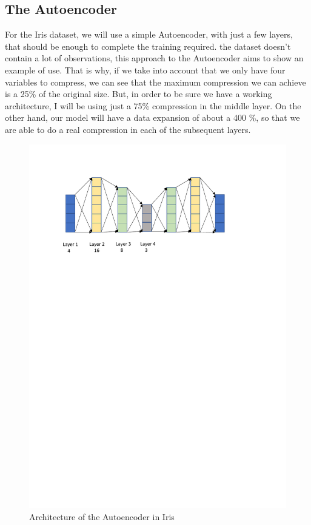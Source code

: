 \subsection{The Autoencoder}

For the Iris dataset, we will use a simple Autoencoder, with just a few layers, that should be enough to complete the training required. the dataset doesn't contain a lot of observations, this approach to the Autoencoder aims to show an example of use. 
%
That is why, if we take into account that we only have four variables to compress, we can see that the maximum compression we can achieve is a 25\% of the original size. But, in order to be sure we have a working architecture, I will be using just a 75\% compression in the middle layer. On the other hand, our model will have a data expansion of about a 400 \%, so that we are able to do a real compression in each of the subsequent layers.
%
\begin{figure}[H]
	\centering
	\includegraphics[width=17cm]{Figuras_tfg/Autoencoder_Results}
	\caption{Architecture of the Autoencoder in Iris}
	\label{fig:figure_autoencoder_Iris}
\end{figure}


